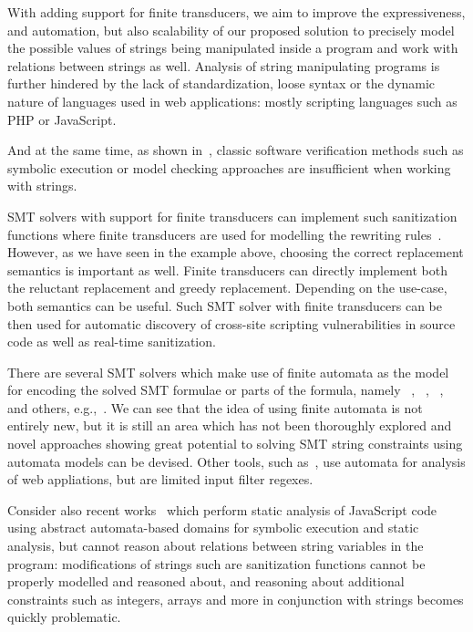 With adding support for finite transducers, we aim to improve the expressiveness, and automation, but also scalability of our proposed solution to precisely model the possible values of strings being manipulated inside a program and work with relations between strings as well.
Analysis of string manipulating programs is further hindered by the lack of standardization, loose syntax or the dynamic nature of languages used in web applications: mostly scripting languages such as PHP or JavaScript.

And at the same time, as shown in~\cite{analjschallenges17}, classic software verification methods such as symbolic execution or model checking approaches are insufficient when working with strings.

SMT solvers with support for finite transducers can implement such sanitization functions where finite transducers are used for modelling the rewriting rules~\cite{rewriting_rules_kaplan94, rewriting_rules_karttunen97}.
However, as we have seen in the example above, choosing the correct replacement semantics is important as well.
Finite transducers can directly implement both the reluctant replacement and greedy replacement.
Depending on the use-case, both semantics can be useful.
Such SMT solver with finite transducers can be then used for automatic discovery of cross-site scripting vulnerabilities in source code as well as real-time sanitization.

There are several SMT solvers which make use of finite automata as the model for encoding the solved SMT formulae or parts of the formula, namely \ziiistriiire~\cite{Z3str3RE}, \trau~\cite{Trau}, \norn~\cite{Norn}, and others, e.g.,~\cite{AnthonyComplex2019}.
We can see that the idea of using finite automata is not entirely new, but it is still an area which has not been thoroughly explored and novel approaches showing great potential to solving SMT string constraints using automata models can be devised.
Other tools, such as~\cite{black_ostrich}, use automata for analysis of web appliations, but are limited input filter regexes.

Consider also recent works~\cite{tarsis24,MSAzure20} which perform static analysis of JavaScript code using abstract automata-based domains for symbolic execution and static analysis, but cannot reason about relations between string variables in the program: modifications of strings such are sanitization functions cannot be properly modelled and reasoned about, and reasoning about additional constraints such as integers, arrays and more in conjunction with strings becomes quickly problematic.

